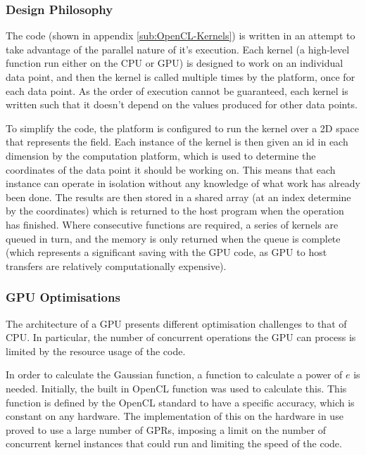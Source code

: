 \documentclass[10pt]{article}
\begin{document}
\subsubsection{Design Philosophy}

The code (shown in appendix \ref{sub:OpenCL-Kernels}) is written in an attempt to take advantage of the parallel nature of it's execution. Each kernel (a high-level function run either on the \ac{CPU} or \ac{GPU}) is designed to work on an individual data point, and then the kernel is called multiple times by the platform, once for each data point. As the order of execution cannot be guaranteed, each kernel is written such that it doesn't depend on the values produced for other data points.

To simplify the code, the platform is configured to run the kernel over a 2D space that represents the field. Each instance of the kernel is then given an id in each dimension by the computation platform, which is used to determine the coordinates of the data point it should be working on. This means that each instance can operate in isolation without any knowledge of what work has already been done. The results are then stored in a shared array (at an index determine by the coordinates) which is returned to the host program when the operation has finished. Where consecutive functions are required, a series of kernels are queued in turn, and the memory is only returned when the queue is complete (which represents a significant saving with the \ac{GPU} code, as \ac{GPU} to host transfers are relatively computationally expensive).

\subsubsection{\ac{GPU} Optimisations}

The architecture of a \ac{GPU} presents different optimisation challenges to that of \ac{CPU}. In particular, the number of concurrent operations the \ac{GPU} can process is limited by the resource usage of the code.

In order to calculate the Gaussian function, a function to calculate a power of $e$ is needed. Initially, the built in OpenCL function was used to calculate this. This function is defined by the OpenCL standard to have a specific accuracy, which is constant on any hardware. The implementation of this on the hardware in use proved to use a large number of \acp{GPR}, imposing a limit on the number of concurrent kernel instances that could run and limiting the speed of the code.
\end{document}
